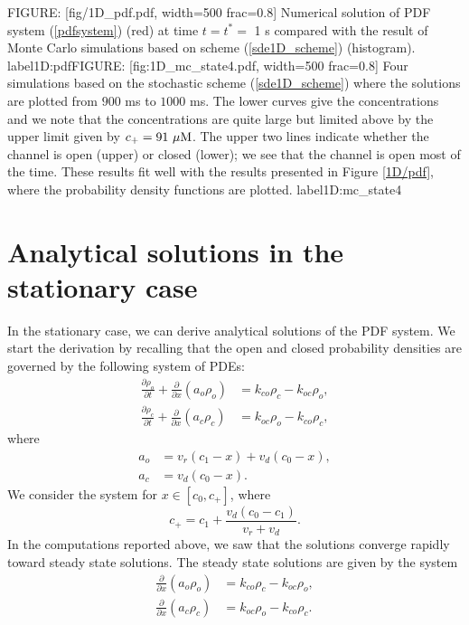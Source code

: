 FIGURE: [fig/1D_pdf.pdf, width=500 frac=0.8] Numerical solution of PDF system  (\ref{pdfsystem})  (red) at time $t=t^*=$ 1 s compared with the result of Monte Carlo simulations based on scheme  (\ref{sde1D_scheme}) (histogram).  label{1D:pdf}FIGURE: [fig:1D_mc_state4.pdf, width=500 frac=0.8] Four simulations  based on  the stochastic scheme (\ref{sde1D_scheme}) where the solutions are plotted from $900$ ms to $1000$ ms. The lower curves give the concentrations and we note that the concentrations are quite large but limited above by the upper limit given by $c_+=91\text{ }\rm{\mu M}$. The upper two lines indicate whether the channel is open (upper) or closed (lower); we see that the channel is open most of the time. These results fit well with the results presented in Figure \ref{1D/pdf}, where the probability density functions are plotted. label{1D:mc_state4}\section{Analytical solutions in the stationary case}
\label{sec:analytical}
In the stationary case, we can derive analytical solutions of the PDF system.
We start the derivation by recalling that the open and closed probability densities are governed by the
following system of PDEs:
\begin{align}
\frac{\partial\rho_{o}}{\partial t}+\frac{\partial}{\partial x}\left(
a_{o}\rho_{o}\right)   &  = k_{co}\rho_{c}-k_{oc}\rho_{o},\\
\frac{\partial\rho_{c}}{\partial t}+\frac{\partial}{\partial x}\left(
a_{c}\rho_{c}\right)   &  =k_{oc}\rho_{o}- k_{co}\rho_{c},
\end{align}
where 
\begin{align}
a_{o} &  =v_{r}(c_{1}-x)+v_{d}(c_{0}-x),\label{fluxes22}\\
a_{c} &  =v_{d}(c_{0}-x).\nonumber
\end{align}
We consider the system for $x\in\left[  c_{0},c_{+}\right]$, where
\[
c_{+}=c_{1}+\frac{v_{d}\left(  c_{0}-c_{1}\right)  }{v_{r}+v_{d}}.
\]
In the computations reported above, we saw that the solutions converge rapidly
 toward steady state solutions. The steady state solutions are given
by the system
\begin{align}
\frac{\partial}{\partial x}\left(  a_{o}\rho_{o}\right)   &  = k_{co}
\rho_{c}-k_{oc}\rho_{o}, \label{steadystate1}\\
\frac{\partial}{\partial x}\left(  a_{c}\rho_{c}\right)   &  =k_{oc}\rho
_{o}- k_{co}\rho_{c}. \label{steadystate2}
\end{align}
